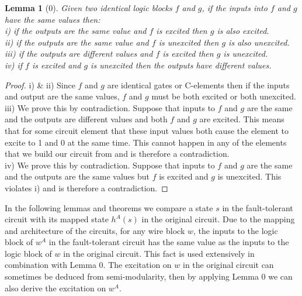 \documentclass[12pt]{report}
\newtheorem*{lemma}{Lemma}
\begin{document}
\begin{lemma}[0]
Given two identical logic blocks $f$ and $g$, if the inputs into $f$ and $g$ have the same values then:\\
i)  if the outputs are the same value and $f$ is excited then $g$ is also excited.\\
ii)  if the outputs are the same value and $f$ is unexcited then $g$ is also unexcited.\\
iii)  if the outputs are different values and $f$ is excited then $g$ is unexcited.\\
iv)  if $f$ is excited and $g$ is unexcited then the outputs have different values.
\end{lemma}
\begin{proof}
i) \& ii)  Since $f$ and $g$ are identical gates or C-elements then if the inputs and output are the same values, $f$ and $g$ must be both excited or both unexcited. \\
iii)  We prove this by contradiction.  Suppose that inputs to $f$ and $g$ are the same and the outputs are different values and both $f$ and $g$ are excited.  This means that for some circuit element that these input values both cause the element to excite to 1 and 0 at the same time.  This cannot happen in any of the elements that we build our circuit from and is therefore a contradiction.\\
iv)  We prove this by contradiction.  Suppose that inputs to $f$ and $g$ are the same and the outputs are the same values but $f$ is excited and $g$ is unexcited.  This violates i) and is therefore a contradiction.  
\end{proof}

In the following lemmas and theorems we compare a state $s$ in the fault-tolerant circuit with its mapped state $h^A(s)$ in the original circuit.  Due to the mapping and architecture of the circuits, for any wire block $w$, the inputs to the logic block of $w^A$ in the fault-tolerant circuit has the same value as the inputs to the logic block of $w$ in the original circuit.  This fact is used extensively in combination with Lemma 0.  The excitation on $w$ in the original circuit can sometimes be deduced from semi-modularity, then by applying Lemma 0 we can also derive the excitation on $w^A$.  \\
\end{document}
